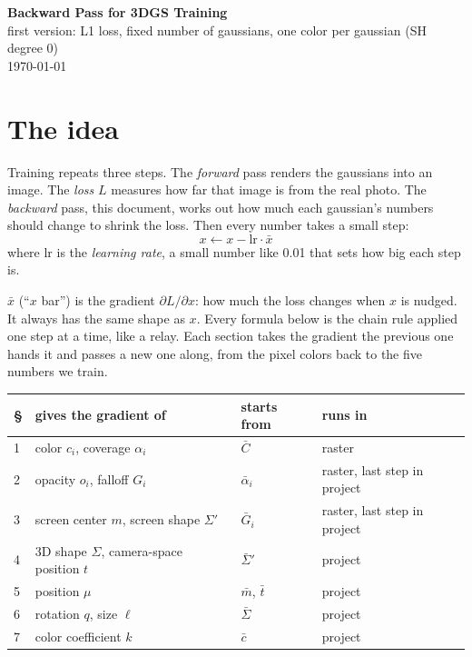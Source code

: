 \documentclass[11pt]{article}
\begin{document}
\begin{center}
{\Large\bfseries Backward Pass for 3DGS Training}\\[0.3em]
first version: L1 loss, fixed number of gaussians, one color per gaussian (SH degree 0)\\ \today
\end{center}

\section*{The idea}

Training repeats three steps. The \emph{forward} pass renders the gaussians into an image. The \emph{loss} $L$ measures how far that image is from the real photo. The \emph{backward} pass, this document, works out how much each gaussian's numbers should change to shrink the loss. Then every number takes a small step:
\[
x \gets x - \text{lr}\cdot\bar x
\]
where lr is the \emph{learning rate}, a small number like 0.01 that sets how big each step is.


$\bar x$ (``$x$ bar'') is the gradient $\partial L/\partial x$: how much the loss changes when $x$ is nudged. It always has the same shape as $x$. Every formula below is the chain rule applied one step at a time, like a relay. Each section takes the gradient the previous one hands it and passes a new one along, from the pixel colors back to the five numbers we train.

\begin{center}
\begin{tabular}{@{}llll@{}}
\toprule
\S & gives the gradient of & starts from & runs in \\
\midrule
1 & color $c_i$, coverage $\alpha_i$ & $\bar C$ & raster \\
2 & opacity $o_i$, falloff $G_i$ & $\bar\alpha_i$ & raster, last step in project \\
3 & screen center $m$, screen shape $\Sigma'$ & $\bar G_i$ & raster, last step in project \\
4 & 3D shape $\Sigma$, camera-space position $t$ & $\bar\Sigma'$ & project \\
5 & position $\mu$ & $\bar m$, $\bar t$ & project \\
6 & rotation $q$, size $\ell$ & $\bar\Sigma$ & project \\
7 & color coefficient $k$ & $\bar c$ & project \\
\bottomrule
\end{tabular}
\end{center}
\end{document}

